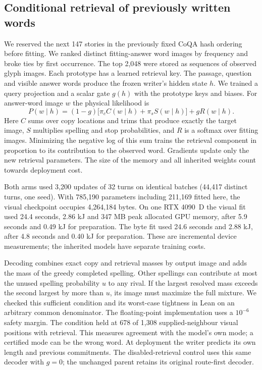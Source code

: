 \subsection*{Conditional retrieval of previously written words}
We reserved the next 147 stories in the previously fixed CoQA hash ordering before fitting. We ranked distinct fitting-answer word images by frequency and broke ties by first occurrence. The top 2,048 were stored as sequences of observed glyph images. Each prototype has a learned retrieval key. The passage, question and visible answer words produce the frozen writer's hidden state $h$. We trained a query projection and a scalar gate $g(h)$ with the prototype keys and biases. For answer-word image $w$ the physical likelihood is
\[
P(w\mid h)=(1-g)\bigl[\pi_c C(w\mid h)+\pi_s S(w\mid h)\bigr]+g R(w\mid h).
\]
Here $C$ sums over copy locations and trims that produce exactly the target image, $S$ multiplies spelling and stop probabilities, and $R$ is a softmax over fitting images. Minimizing the negative log of this sum trains the retrieval component in proportion to its contribution to the observed word. Gradients update only the new retrieval parameters. The size of the memory and all inherited weights count towards deployment cost.

Both arms used 3,200 updates of 32 turns on identical batches (44,417 distinct turns, one seed). With 785,190 parameters including 211,169 fitted here, the visual checkpoint occupies 4,264,184 bytes. On one RTX 4090~D the visual fit used 24.4 seconds, 2.86 kJ and 347 MB peak allocated GPU memory, after 5.9 seconds and 0.49 kJ for preparation. The byte fit used 24.6 seconds and 2.88 kJ, after 4.8 seconds and 0.40 kJ for preparation. These are incremental device measurements; the inherited models have separate training costs.

Decoding combines exact copy and retrieval masses by output image and adds the mass of the greedy completed spelling. Other spellings can contribute at most the unused spelling probability $u$ to any rival. If the largest resolved mass exceeds the second largest by more than $u$, its image must maximize the full mixture. We checked this sufficient condition and its worst-case tightness in Lean on an arbitrary common denominator. The floating-point implementation uses a $10^{-6}$ safety margin. The condition held at 678 of 1,308 supplied-neighbour visual positions with retrieval. This measures agreement with the model's own mode; a certified mode can be the wrong word. At deployment the writer predicts its own length and previous commitments. The disabled-retrieval control uses this same decoder with $g=0$; the unchanged parent retains its original route-first decoder.
